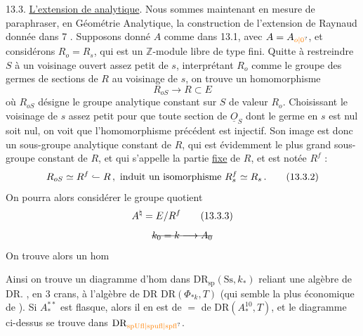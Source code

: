13.3. \uline{L'extension de  analytique}. Nous sommes maintenant en mesure de paraphraser, en Géométrie Analytique, la construction de l'extension de Raynaud donnée dans 7 . Supposons donné $A$ comme dans 13.1, avec $A=A_{\unsure{o|0}}$, et considérons $R_o=R_s$, qui est un $\mathbb Z$-module libre de type fini. Quitte à restreindre $S$ à un voisinage ouvert assez petit de $s$, interprétant $R_o$ comme le groupe des germes de sections de $R$ au voisinage de $s$, on trouve un homomorphisme
\[
 R_{oS}\longrightarrow R\subset E \tag*{(13.3.1)}
\]
où $R_{oS}$ désigne le groupe analytique constant sur $S$ de valeur $R_o$. Choisissant le voisinage de $s$ assez petit pour que toute section de $\underline O_S$ dont le germe en $s$ est nul soit nul, on voit que l'homomorphisme précédent est injectif. Son image est donc un sous-groupe analytique constant de $R$, qui est évidemment le plus grand sous-groupe constant de $R$, et qui s'appelle la partie \uline{fixe} de $R$, et est notée $R^f$ :
\[
 R_{oS}\simeq R^f\lhook\joinrel\relbar R\,,\ \text{induit un isomorphisme } R^f_s\simeq R_s\,.
 \tag*{(13.3.2)}
\]
On pourra alors considérer le groupe quotient
\[
 A^{\natural}=E/R^f\tag*{(13.3.3)}
\]
\[
 \deleted{k_0=k\longrightarrow A_0}
\]
On trouve alors un hom 

Ainsi on trouve un diagramme  d'hom dans $\mathrm{DR}_{\mathrm{sp}}(\mathrm{Ss},k_*)$
reliant une algèbre de DR. , en 3 crans, à l'algèbre de DR  $\mathrm{DR}(\Phi_{*k},T)$ (qui semble la plus économique de ). Si $A_*^{**}$ est  flasque, alors il en est de $=$ de $\mathrm{DR}(A_*^{10},T)$, et le diagramme ci-dessus se trouve dans $\mathrm{DR}_{\unsure{\mathrm{spUfl}|\mathrm{spufl}|\mathrm{spfl}}}$.

